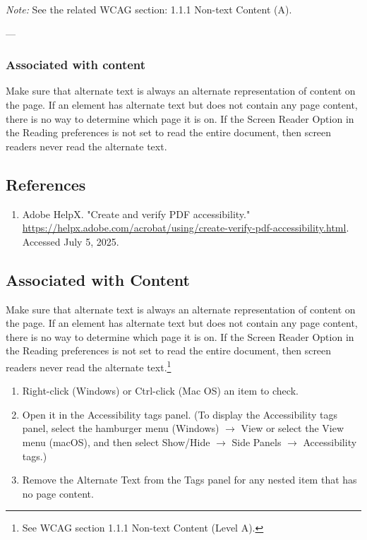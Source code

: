 \vspace{0.5em}
\noindent\textit{Note:} See the related WCAG section: 1.1.1 Non-text Content (A)\footnotemark[1].

---

\subsubsection*{Associated with content}
Make sure that alternate text is always an alternate representation of content on the page. If an element has alternate text but does not contain any page content, there is no way to determine which page it is on. If the Screen Reader Option in the Reading preferences is not set to read the entire document, then screen readers never read the alternate text\footnotemark[1].

\vfill
\subsection*{References}
\begin{enumerate}
    \item Adobe HelpX. "Create and verify PDF accessibility." \url{https://helpx.adobe.com/acrobat/using/create-verify-pdf-accessibility.html}. Accessed July 5, 2025.
\end{enumerate}

\subsection*{Associated with Content}
Make sure that alternate text is always an alternate representation of content on the page. If an element has alternate text but does not contain any page content, there is no way to determine which page it is on. If the Screen Reader Option in the Reading preferences is not set to read the entire document, then screen readers never read the alternate text.\footnote{See WCAG section 1.1.1 Non-text Content (Level A).}

\begin{enumerate}
    \item Right-click (Windows) or Ctrl-click (Mac OS) an item to check.
    \item Open it in the Accessibility tags panel. (To display the Accessibility tags panel, select the hamburger menu (Windows) $\rightarrow$ View or select the View menu (macOS), and then select Show/Hide $\rightarrow$ Side Panels $\rightarrow$ Accessibility tags.)
    \item Remove the Alternate Text from the Tags panel for any nested item that has no page content.
\end{enumerate}

